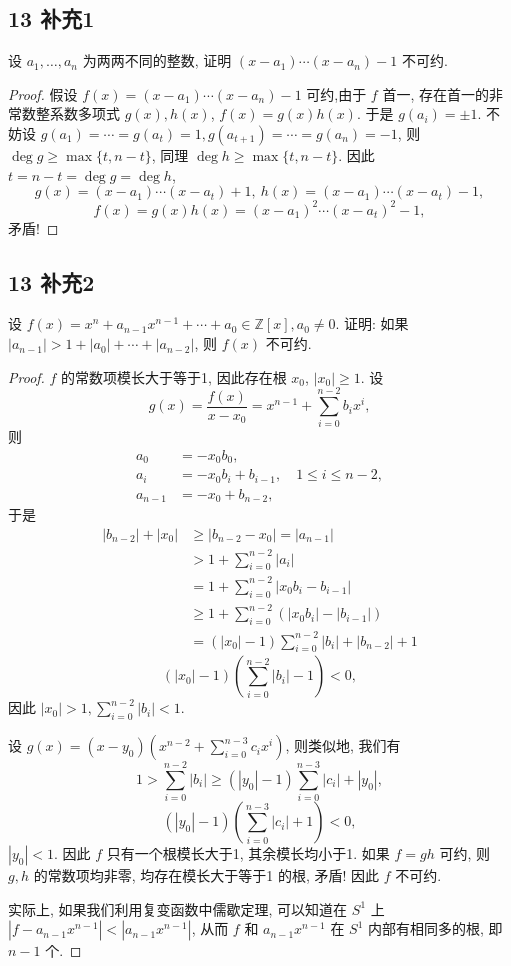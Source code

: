 \documentclass[12pt,a4paper,reqno]{amsart}
\theoremstyle{remark}
\newcommand{\Z}{\mathbb{Z}}
\renewcommand{\le}{\leqslant}
\begin{document}
\subsection*{13 补充1}
设 $a_1,\ldots,a_n$ 为两两不同的整数, 证明 $(x-a_1)\cdots(x-a_n)-1$ 不可约.
\begin{proof}
假设 $f(x)=(x-a_1)\cdots (x-a_n)-1$ 可约,由于 $f$ 首一, 存在首一的非常数整系数多项式 $g(x), h(x)$, $f(x)=g(x)h(x)$. 于是 $g(a_i)=\pm 1$. 不妨设 $g(a_1)=\cdots=g(a_t)=1, g(a_{t+1})=\cdots=g(a_n)=-1$, 则 $\deg g\geq \max\{t,n-t\}$, 同理 $\deg h\geq \max\{t,n-t\}$. 因此 $t=n-t=\deg g=\deg h$,
\[g(x)=(x-a_1)\cdots(x-a_t)+1,\ h(x)=(x-a_1)\cdots(x-a_t)-1,\]
\[f(x)=g(x)h(x)=(x-a_1)^2\cdots(x-a_t)^2-1,\]
矛盾!
\end{proof}

\subsection*{13 补充2}
设 $f(x)=x^n+a_{n-1}x^{n-1}+\cdots+a_0\in\Z[x],a_0\neq 0$.   证明: 如果 $|a_{n-1}|>1+|a_0|+\cdots+|a_{n-2}|$, 则 $f(x)$ 不可约.
\begin{proof}
$f$ 的常数项模长大于等于1, 因此存在根 $x_0$, $|x_0|\geq 1$. 设
  \[ g(x)=\frac{f(x)}{x-x_0}=x^{n-1}+\sum_{i=0}^{n-2} b_i x^i, \]
则
  \[ \begin{split}
        a_0&=-x_0b_0,\\
        a_i&=-x_0b_i+b_{i-1},\quad 1\le i\le n-2,\\
    a_{n-1}&=-x_0+b_{n-2}, \end{split}\]
于是
  \[ \begin{split}
    |b_{n-2}|+|x_0|&\geq |b_{n-2}-x_0|=|a_{n-1}|\\
                   &>1+\sum_{i=0}^{n-2}|a_i|\\
		  	       &=1+\sum_{i=0}^{n-2}|x_0b_i-b_{i-1}|\\
			       &\geq 1+\sum_{i=0}^{n-2}(|x_0b_i|-|b_{i-1}|)\\
			       &=(|x_0|-1)\sum_{i=0}^{n-2}|b_i| +|b_{n-2}|+1
  \end{split} \]
  \[ (|x_0|-1)(\sum_{i=0}^{n-2}|b_i|-1)<0, \]
因此 $|x_0|>1, \sum_{i=0}^{n-2}|b_i|<1$.

设 $g(x)=(x-y_0)(x^{n-2}+\sum_{i=0}^{n-3}c_i x^i)$, 则类似地, 我们有
\[ 1>\sum_{i=0}^{n-2}|b_i|\geq (|y_0|-1)\sum_{i=0}^{n-3}|c_i|+|y_0|,\]
\[ (|y_0|-1)(\sum_{i=0}^{n-3}|c_i|+1)<0, \]
$|y_0|<1$. 因此 $f$ 只有一个根模长大于1, 其余模长均小于1. 如果 $f=gh$  可约, 则 $g,h$ 的常数项均非零, 均存在模长大于等于1 的根, 矛盾! 因此 $f$ 不可约.

实际上, 如果我们利用复变函数中儒歇定理, 可以知道在 $S^1$ 上 $|f-a_{n-1}x^{n-1}|<|a_{n-1}x^{n-1}|$, 从而 $f$ 和 $a_{n-1}x^{n-1}$ 在 $S^1$ 内部有相同多的根, 即 $n-1$ 个.
\end{proof}
\end{document}
